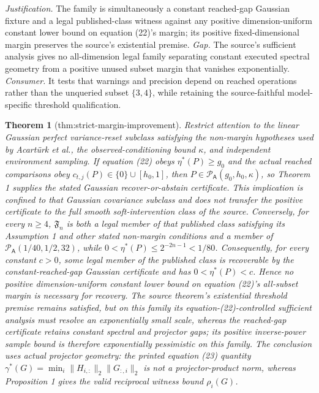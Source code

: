 \documentclass{article}
\newtheorem{theorem}{Theorem}
\begin{document}
\par\smallskip\noindent \textit{Justification.} The family is simultaneously a constant reached-gap Gaussian fixture and a legal published-class witness against any positive dimension-uniform constant lower bound on equation (22)'s margin; its positive fixed-dimensional margin preserves the source's existential premise. \textit{Gap.} The source's sufficient analysis gives no all-dimension legal family separating constant executed spectral geometry from a positive unused subset margin that vanishes exponentially. \textit{Consumer.} It tests that warnings and precision depend on reached operations rather than the unqueried subset \(\{3,4\}\), while retaining the source-faithful model-specific threshold qualification.

\begin{theorem}[thm:strict-margin-improvement]\label{thm:strict-margin-improvement}
Restrict attention to the linear Gaussian perfect variance-reset subclass satisfying the non-margin hypotheses used by Acartürk et al., the observed-conditioning bound \(\kappa\), and independent environment sampling. If equation (22) obeys \(\eta^{\ast}(P)\ge g_0\) and the actual reached comparisons obey \(c_{t,j}(P)\in\{0\}\cup[h_0,1]\), then \(P\in\mathcal P_{\mathsf A}(g_0,h_0,\kappa)\), so Theorem 1 supplies the stated Gaussian recover-or-abstain certificate. This implication is confined to that Gaussian covariance subclass and does not transfer the positive certificate to the full smooth soft-intervention class of the source. Conversely, for every \(n\ge4\), \(\mathfrak F_n\) is both a legal member of that published class satisfying its Assumption 1 and other stated non-margin conditions and a member of \(\mathcal P_{\mathsf A}(1/40,1/2,32)\), while \(0<\eta^{\ast}(P)\le2^{-2n-1}<1/80\). Consequently, for every constant \(c>0\), some legal member of the published class is recoverable by the constant-reached-gap Gaussian certificate and has \(0<\eta^{\ast}(P)<c\). Hence no positive dimension-uniform constant lower bound on equation (22)'s all-subset margin is necessary for recovery. The source theorem's existential threshold premise remains satisfied, but on this family its equation-(22)-controlled sufficient analysis must resolve an exponentially small scale, whereas the reached-gap certificate retains constant spectral and projector gaps; its positive inverse-power sample bound is therefore exponentially pessimistic on this family. The conclusion uses actual projector geometry: the printed equation (23) quantity \(\gamma^{\ast}(G)=\min_i\|H_{i,:}\|_2\|G_{:,i}\|_2\) is not a projector-product norm, whereas Proposition 1 gives the valid reciprocal witness bound \(\rho_i(G)\).
\end{theorem}
\end{document}

